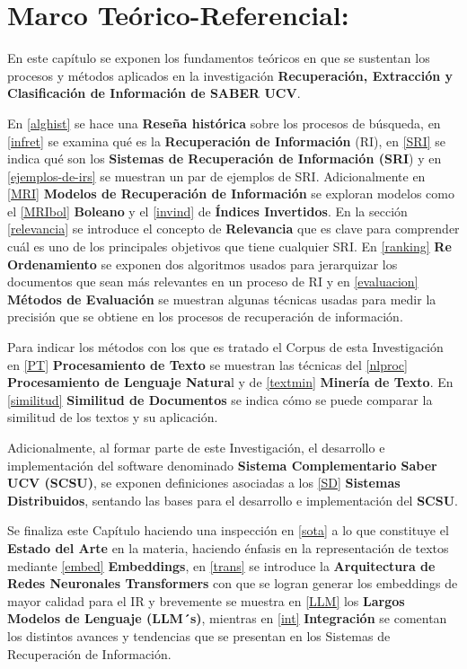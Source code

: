 \documentclass[
  12pt,
  openany]{book}
\begin{document}
\hypertarget{teorico}{%
\chapter{Marco Teórico-Referencial:}\label{teorico}}

En este capítulo se exponen los fundamentos teóricos en que se sustentan los procesos y métodos aplicados en la investigación \textbf{Recuperación, Extracción y Clasificación de Información de SABER UCV}.

En \ref{alghist} se hace una \textbf{Reseña histórica} sobre los procesos de búsqueda, en \ref{infret} se examina qué es la \textbf{Recuperación de Información} (RI), en \ref{SRI} se indica qué son los \textbf{Sistemas de Recuperación de Información (SRI}) y en \ref{ejemplos-de-irs} se muestran un par de ejemplos de SRI. Adicionalmente en \ref{MRI} \textbf{Modelos de Recuperación de Información} se exploran modelos como el \ref{MRIbol} \textbf{Boleano} y el \ref{invind} de \textbf{Índices Invertidos}. En la sección \ref{relevancia} se introduce el concepto de \textbf{Relevancia} que es clave para comprender cuál es uno de los principales objetivos que tiene cualquier SRI. En \ref{ranking} \textbf{Re Ordenamiento} se exponen dos algoritmos usados para jerarquizar los documentos que sean más relevantes en un proceso de RI y en \ref{evaluacion} \textbf{Métodos de Evaluación} se muestran algunas técnicas usadas para medir la precisión que se obtiene en los procesos de recuperación de información.

Para indicar los métodos con los que es tratado el Corpus de esta Investigación en \ref{PT} \textbf{Procesamiento de Texto} se muestran las técnicas del \ref{nlproc} \textbf{Procesamiento de Lenguaje Natura}l y de \ref{textmin} \textbf{Minería de Texto}. En \ref{similitud} \textbf{Similitud de Documentos} se indica cómo se puede comparar la similitud de los textos y su aplicación.

Adicionalmente, al formar parte de este Investigación, el desarrollo e implementación del software denominado \textbf{Sistema Complementario Saber UCV (SCSU)}, se exponen definiciones asociadas a los \ref{SD} \textbf{Sistemas Distribuidos}, sentando las bases para el desarrollo e implementación del \textbf{SCSU}.

Se finaliza este Capítulo haciendo una inspección en \ref{sota} a lo que constituye el \textbf{Estado del Arte} en la materia, haciendo énfasis en la representación de textos mediante \ref{embed} \textbf{Embeddings}, en \ref{trans} se introduce la \textbf{Arquitectura de} \textbf{Redes Neuronales Transformers} con que se logran generar los embeddings de mayor calidad para el IR y brevemente se muestra en \ref{LLM} los \textbf{Largos Modelos de Lenguaje (LLM´s)}, mientras en \ref{int} \textbf{Integración} se comentan los distintos avances y tendencias que se presentan en los Sistemas de Recuperación de Información.
\end{document}
